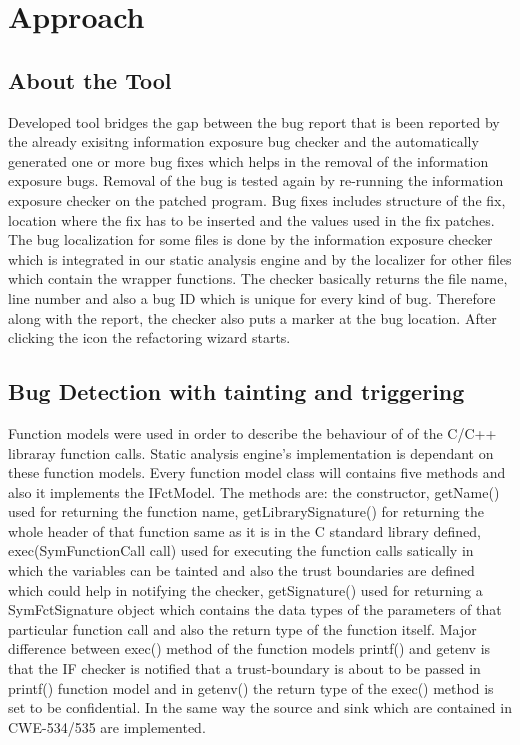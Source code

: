 \chapter{Approach}
\label{chapter:Approach}


\section{About the Tool}
Developed tool bridges the gap between the bug report 
that is been reported by the already exisitng information
exposure bug checker and the automatically generated one
or more bug fixes which helps in the removal of the information
exposure bugs. Removal of the bug is tested again by re-running
the information exposure checker on the patched program.
Bug fixes includes 
structure of the fix, location where the fix has 
to be inserted
and the values used in the fix patches. The bug localization
for some files is done
by the information exposure checker which is 
integrated in our static analysis engine and
by the localizer for other files which contain 
the wrapper functions. The checker basically returns the file name,
line number and also a bug ID which is unique for every kind of bug.
Therefore along with the report, the checker also puts a marker at the bug location.
After clicking the icon the refactoring wizard starts.


\section{Bug Detection with tainting and triggering}

Function models were used in order to describe the behaviour of of the C/C++ libraray function calls.
Static analysis engine's implementation is dependant on these function models.
Every function model class will contains five methods and also it implements the IFctModel.
The methods are: the constructor, getName() used for returning the function name,
getLibrarySignature() for returning the whole header of that function 
same as it is in the C standard library defined, exec(SymFunctionCall call)
used for executing the function calls satically
in which the variables can be tainted and also the trust
boundaries are defined which could help
in notifying the checker, getSignature() used for returning a SymFctSignature object
which contains the data types of the parameters of that particular function call
and also the return type of the function itself.
Major difference between exec() method of the 
function models printf() and getenv is that the IF
checker is notified that a trust-boundary is about to be passed
in printf() function model and in getenv() the return type of the exec()
method is set to be confidential. In the same way the source and sink 
which are contained in CWE-534/535 are implemented.


